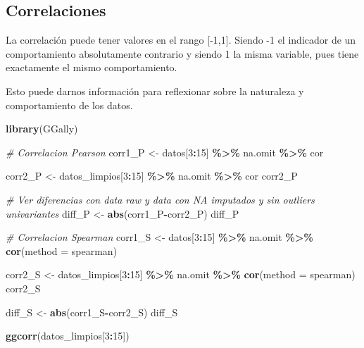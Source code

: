 \documentclass[notspecified,article,submit,moreauthors,pdftex]{Definitions/mdpi}
\newenvironment{Shaded}{\begin{snugshade}}{\end{snugshade}}
\newcommand{\AttributeTok}[1]{\textcolor[rgb]{0.13,0.29,0.53}{#1}}
\newcommand{\CommentTok}[1]{\textcolor[rgb]{0.56,0.35,0.01}{\textit{#1}}}
\newcommand{\DecValTok}[1]{\textcolor[rgb]{0.00,0.00,0.81}{#1}}
\newcommand{\FunctionTok}[1]{\textcolor[rgb]{0.13,0.29,0.53}{\textbf{#1}}}
\newcommand{\NormalTok}[1]{#1}
\newcommand{\OtherTok}[1]{\textcolor[rgb]{0.56,0.35,0.01}{#1}}
\newcommand{\SpecialCharTok}[1]{\textcolor[rgb]{0.81,0.36,0.00}{\textbf{#1}}}
\newcommand{\StringTok}[1]{\textcolor[rgb]{0.31,0.60,0.02}{#1}}
\begin{document}
\hypertarget{correlaciones}{%
\subsection{Correlaciones}\label{correlaciones}}

La correlación puede tener valores en el rango {[}-1,1{]}. Siendo -1 el
indicador de un comportamiento absolutamente contrario y siendo 1 la
misma variable, pues tiene exactamente el mismo comportamiento.

Esto puede darnos información para reflexionar sobre la naturaleza y
comportamiento de los datos.

\begin{Shaded}
\begin{Highlighting}[]
\FunctionTok{library}\NormalTok{(GGally)}

\CommentTok{\# Correlacion Pearson}
\NormalTok{corr1\_P }\OtherTok{\textless{}{-}}\NormalTok{ datos[}\DecValTok{3}\SpecialCharTok{:}\DecValTok{15}\NormalTok{] }\SpecialCharTok{\%\textgreater{}\%}
\NormalTok{  na.omit }\SpecialCharTok{\%\textgreater{}\%}
\NormalTok{  cor}

\NormalTok{corr2\_P }\OtherTok{\textless{}{-}}\NormalTok{ datos\_limpios[}\DecValTok{3}\SpecialCharTok{:}\DecValTok{15}\NormalTok{] }\SpecialCharTok{\%\textgreater{}\%}
\NormalTok{  na.omit }\SpecialCharTok{\%\textgreater{}\%}
\NormalTok{  cor}
\NormalTok{corr2\_P}

\CommentTok{\# Ver diferencias con data raw y data con NA imputados y sin outliers univariantes}
\NormalTok{diff\_P }\OtherTok{\textless{}{-}} \FunctionTok{abs}\NormalTok{(corr1\_P}\SpecialCharTok{{-}}\NormalTok{corr2\_P)}
\NormalTok{diff\_P}

\CommentTok{\# Correlacion Spearman}
\NormalTok{corr1\_S }\OtherTok{\textless{}{-}}\NormalTok{ datos[}\DecValTok{3}\SpecialCharTok{:}\DecValTok{15}\NormalTok{] }\SpecialCharTok{\%\textgreater{}\%}
\NormalTok{  na.omit }\SpecialCharTok{\%\textgreater{}\%}
  \FunctionTok{cor}\NormalTok{(}\AttributeTok{method =} \StringTok{\textquotesingle{}spearman\textquotesingle{}}\NormalTok{)}

\NormalTok{corr2\_S }\OtherTok{\textless{}{-}}\NormalTok{ datos\_limpios[}\DecValTok{3}\SpecialCharTok{:}\DecValTok{15}\NormalTok{] }\SpecialCharTok{\%\textgreater{}\%}
\NormalTok{  na.omit }\SpecialCharTok{\%\textgreater{}\%}
  \FunctionTok{cor}\NormalTok{(}\AttributeTok{method =} \StringTok{\textquotesingle{}spearman\textquotesingle{}}\NormalTok{)}
\NormalTok{corr2\_S}

\NormalTok{diff\_S }\OtherTok{\textless{}{-}} \FunctionTok{abs}\NormalTok{(corr1\_S}\SpecialCharTok{{-}}\NormalTok{corr2\_S)}
\NormalTok{diff\_S}

\FunctionTok{ggcorr}\NormalTok{(datos\_limpios[}\DecValTok{3}\SpecialCharTok{:}\DecValTok{15}\NormalTok{])}
\end{Highlighting}
\end{Shaded}
\end{document}
